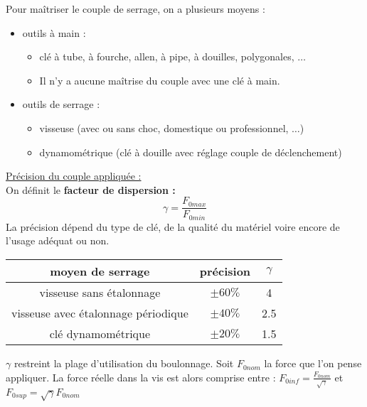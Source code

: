 \documentclass[../main.tex]{subfiles}
\begin{document}
Pour maîtriser le couple de serrage, on a plusieurs moyens :\\
\begin{itemize}
    \item outils à main :\begin{itemize}
        \item clé à tube, à fourche, allen, à pipe, à douilles, polygonales, $\dots$\\
        \item Il n'y a aucune maîtrise du couple avec une clé à main. \\
    \end{itemize}
    \item outils de serrage : \begin{itemize}
        \item visseuse (avec ou sans choc, domestique ou professionnel, $\dots$)\\
        \item dynamométrique (clé à douille avec réglage couple de déclenchement)\\
    \end{itemize}
\end{itemize}

\quad \underline{Précision du couple appliquée :}\\
On définit le \textbf{facteur de dispersion :}\\
\begin{equation}
    \gamma = \frac{F_{0max}}{F_{0min}}
\end{equation}
La précision dépend du type de clé, de la qualité du matériel voire encore de l'usage adéquat ou non. \\
\begin{table}[hbt!]
    \centering
    \begin{tabular}{c|c|c}
        moyen de serrage & précision & $\gamma$ \\
        \hline
        visseuse sans étalonnage & $\pm 60\%$ & 4\\
        \hline
        visseuse avec étalonnage périodique & $\pm 40\%$ & 2.5\\
        \hline
        clé dynamométrique & $\pm 20\%$ & 1.5\\
    \end{tabular}
\end{table}
$\gamma$ restreint la plage d'utilisation du boulonnage. Soit $F_{0nom}$ la force que l'on pense appliquer. La force réelle dans la vis est alors comprise entre : $F_{0inf} = \frac{F_{0nom}}{\sqrt{\gamma}}$ et $F_{0sup} = \sqrt{\gamma} F_{0nom}$\\
\end{document}
